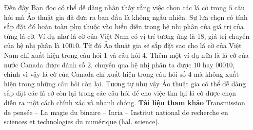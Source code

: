 \begin{multicols}{2}
\begin{table}[H]
	\end{table}
	Đến đây Bạn đọc có thể dễ dàng nhận thấy rằng việc chọn các lá cờ trong $5$ câu hỏi mà Ảo thuật gia đã  đưa ra ban đầu là không ngẫu nhiên. Sự lựa chọn có tính sắp đặt đó hoàn toàn phụ thuộc vào biểu diễn trong hệ nhị phân của giá trị của từng lá cờ. Ví dụ như lá cờ của Việt Nam có vị trí tương ứng là $18$, giá trị chuyển của hệ nhị phân là $10010$. Từ đó Ảo thuật gia sẽ sắp đặt sao cho lá cờ của Việt Nam chỉ xuất hiện trong câu hỏi $1$ và câu hỏi $4$. Thêm một ví dụ nữa là lá cờ của nước Canada được đánh số $2$, chuyển qua hệ nhị phân ta được $10$ hay $00010$, chính vì vậy lá cờ của Canada chỉ xuất hiện trong câu hỏi số $4$ mà không xuất hiện trong những câu hỏi còn lại. Tương tự như vậy Ảo thuật gia có thể dễ dàng sắp đặt các lá cờ còn lại trong các câu hỏi để cho việc tìm lại lá cờ được chọn diễn ra một cách chính xác và nhanh chóng. 
	\vskip 0.1cm
	\textbf{\color{hoccungpi}Tài liệu tham khảo}
	\vskip 0.1cm
	Transmission de pensée -- La magie du binaire -- Inria -- Institut national de recherche en sciences et technologies du numérique (hal. science). 
\end{multicols}